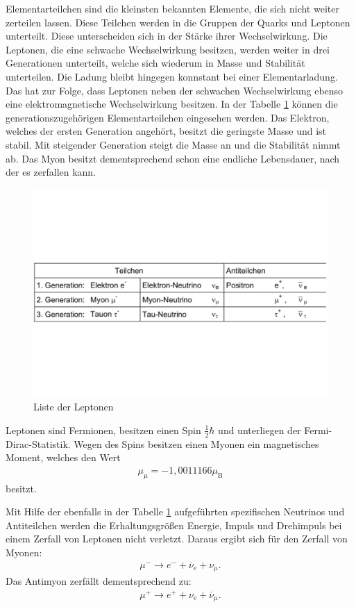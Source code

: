 Elementarteilchen sind die kleinsten bekannten Elemente, die sich nicht weiter zerteilen lassen.
Diese Teilchen werden in die Gruppen der Quarks und Leptonen unterteilt.
Diese unterscheiden sich in der Stärke ihrer Wechselwirkung.
Die Leptonen, die eine schwache Wechselwirkung besitzen, werden weiter in drei Generationen unterteilt, welche sich wiederum in Masse und Stabilität unterteilen.
Die Ladung bleibt hingegen konnstant bei einer Elementarladung.
Das hat zur Folge, dass Leptonen neben der schwachen Wechselwirkung ebenso eine elektromagnetische Wechselwirkung besitzen.
In der Tabelle \ref{fig:gen} können die generationszugehörigen Elementarteilchen eingesehen werden.
Das Elektron, welches der ersten Generation angehört, besitzt die geringste Masse und ist stabil.
Mit steigender Generation steigt die Masse an und die Stabilität nimmt ab.
Das Myon besitzt dementsprechend schon eine endliche Lebensdauer, nach der es zerfallen kann.

\begin{figure}[h!]
  \centering
  \includegraphics[width=\textwidth]{tableptonen.pdf}
  \caption{Liste der Leptonen \cite{1}}
  \label{fig:gen}
\end{figure}
\FloatBarrier

Leptonen sind Fermionen, besitzen einen Spin $\frac{1}{2}\hbar$ und unterliegen der Fermi-Dirac-Statistik.
Wegen des Spins besitzen einen Myonen ein magnetisches Moment, welches den Wert
\begin{align*}
  \mu_{\mu} = -1,0011166\mu_{\text{B}}
\end{align*}
besitzt.

Mit Hilfe der ebenfalls in der Tabelle \ref{fig:gen} aufgeführten spezifischen Neutrinos und Antiteilchen
werden die Erhaltungsgrößen Energie, Impuls und Drehimpuls bei einem Zerfall von Leptonen nicht verletzt.
Daraus ergibt sich für den Zerfall von Myonen:
\begin{align}
  \mu^{-}\rightarrow e^-+\overline{\nu}_\text{e}+\nu_{\mu}.
  \label{eqn:mu-}
\end{align}
Das Antimyon zerfällt dementsprechend zu:
\begin{align}
  \mu^{+}\rightarrow e^++\nu_\text{e}+\overline{\nu}_{\mu}.
  \label{eqn:mu+}
\end{align}

